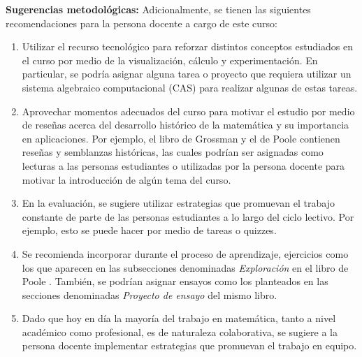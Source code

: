 \begin{refsection}
\textbf{Sugerencias metodológicas:} Adicionalmente, se tienen las siguientes recomendaciones para la persona docente a cargo de este curso:
\begin{enumerate}
    \item Utilizar el recurso tecnológico para reforzar distintos conceptos estudiados en el curso por medio de la visualización, cálculo y experimentación. En particular, se podría asignar alguna tarea o proyecto que requiera utilizar un sistema algebraico computacional (CAS) para realizar algunas de estas tareas.
    \item Aprovechar momentos adecuados del curso para motivar el estudio por medio de reseñas acerca del desarrollo histórico de la matemática y su importancia en aplicaciones. Por ejemplo, el libro de Grossman \cite{Gro19} y el de Poole \cite{Poo17} contienen reseñas y semblanzas históricas, las cuales podrían ser asignadas como lecturas a las personas estudiantes o utilizadas por la persona docente para motivar la introducción de algún tema del curso.
    \item En la evaluación, se sugiere utilizar estrategias que promuevan el trabajo constante de parte de las personas estudiantes a lo largo del ciclo lectivo. Por ejemplo, esto se puede hacer por medio de tareas o quizzes.
    \item Se recomienda incorporar durante el proceso de aprendizaje, ejercicios como los que aparecen en las subsecciones denominadas \textit{Exploración} en el libro de Poole \cite{Poo17}. También, se podrían asignar ensayos como los planteados en las secciones denominadas \textit{Proyecto de ensayo} del mismo libro.
    \item Dado que hoy en día la mayoría del trabajo en matemática, tanto a nivel académico como profesional, es de naturaleza colaborativa, se sugiere a la persona docente implementar estrategias que promuevan el trabajo en equipo.
\end{enumerate}




\nocite{Apo84}
\nocite{Apo85} 
\nocite{Gro19}
\nocite{MM18}
\nocite{HK71}
\nocite{Cur93}
\nocite{Lan87}
\nocite{Tre17}



\printbibliography[heading=subbibliography,section=\the\value{refsection}]
\end{refsection}

